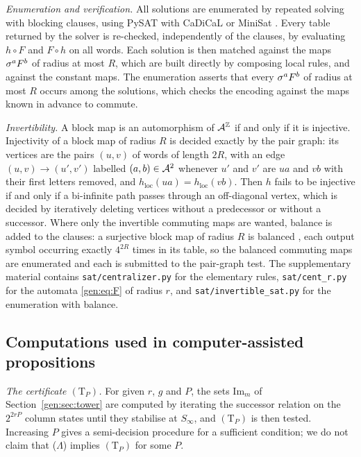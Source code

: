 \emph{Enumeration and verification.} All solutions are enumerated by repeated solving with blocking clauses, using PySAT \cite{PySAT} with CaDiCaL \cite{CaDiCaL} or MiniSat \cite{MiniSat}. Every table returned by the solver is re-checked, independently of the clauses, by evaluating $h\circ F$ and $F\circ h$ on all words. Each solution is then matched against the maps $\sigma^aF^b$ of radius at most $R$, which are built directly by composing local rules, and against the constant maps. The enumeration asserts that every $\sigma^aF^b$ of radius at most $R$ occurs among the solutions, which checks the encoding against the maps known in advance to commute.

\emph{Invertibility.} A block map is an automorphism of $\mathcal{A}^{\mathbb{Z}}$ if and only if it is injective. Injectivity of a block map of radius $R$ is decided exactly by the pair graph: its vertices are the pairs $(u,v)$ of words of length $2R$, with an edge $(u,v)\to(u',v')$ labelled $(a,b)\in\mathcal{A}^2$ whenever $u'$ and $v'$ are $ua$ and $vb$ with their first letters removed, and $h_{\mathrm{loc}}(ua)=h_{\mathrm{loc}}(vb)$. Then $h$ fails to be injective if and only if a bi-infinite path passes through an off-diagonal vertex, which is decided by iteratively deleting vertices without a predecessor or without a successor. Where only the invertible commuting maps are wanted, balance is added to the clauses: a surjective block map of radius $R$ is balanced \cite{Hedlund1969}, each output symbol occurring exactly $4^{2R}$ times in its table, so the balanced commuting maps are enumerated and each is submitted to the pair-graph test. The supplementary material contains \texttt{sat/centralizer.py} for the elementary rules, \texttt{sat/cent\_r.py} for the automata \eqref{gen:eq:F} of radius $r$, and \texttt{sat/invertible\_sat.py} for the enumeration with balance.

\subsection{Computations used in computer-assisted propositions}\label{app:proofs}

\emph{The certificate $(\mathrm T_P)$.}\label{app:general} For given $r$, $g$ and $P$, the sets $\mathrm{Im}_m$ of Section~\ref{gen:sec:tower} are computed by iterating the successor relation on the $2^{2rP}$ column states until they stabilise at $S_\infty$, and $(\mathrm T_P)$ is then tested. Increasing $P$ gives a semi-decision procedure for a sufficient condition; we do not claim that \textup{($\Lambda$)} implies $(\mathrm T_P)$ for some $P$.

